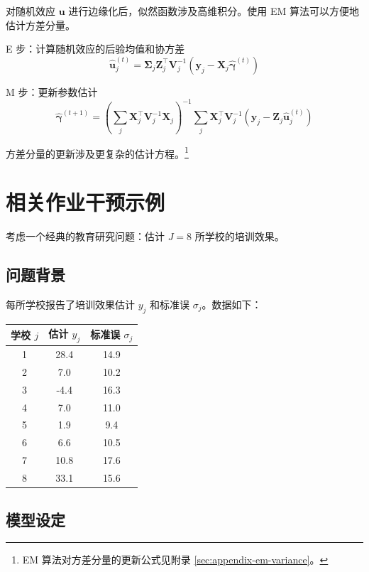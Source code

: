 对随机效应 $\mathbf{u}$ 进行边缘化后，似然函数涉及高维积分。使用 EM 算法可以方便地估计方差分量。

E 步：计算随机效应的后验均值和协方差
\[
\widehat{\mathbf{u}}_j^{(t)} = \boldsymbol{\Sigma}_j \mathbf{Z}_j^\top \mathbf{V}_j^{-1} (\mathbf{y}_j - \mathbf{X}_j \widehat{\boldsymbol{\gamma}}^{(t)})
\]

M 步：更新参数估计
\[
\widehat{\boldsymbol{\gamma}}^{(t+1)} = \left(\sum_j \mathbf{X}_j^\top \mathbf{V}_j^{-1} \mathbf{X}_j \right)^{-1} \sum_j \mathbf{X}_j^\top \mathbf{V}_j^{-1} (\mathbf{y}_j - \mathbf{Z}_j \widehat{\mathbf{u}}_j^{(t)})
\]

方差分量的更新涉及更复杂的估计方程。\footnote{EM 算法对方差分量的更新公式见附录 \cref{sec:appendix-em-variance}。}

\section{相关作业干预示例}
\label{sec:example- coaching}

考虑一个经典的教育研究问题：估计 $J = 8$ 所学校的培训效果。

\subsection{问题背景}
\label{sec:coaching-background}

每所学校报告了培训效果估计 $y_j$ 和标准误 $\sigma_j$。数据如下：

\begin{center}
\begin{tabular}{ccc}
\hline
学校 $j$ & 估计 $y_j$ & 标准误 $\sigma_j$ \\
\hline
1 & 28.4 & 14.9 \\
2 & 7.0 & 10.2 \\
3 & -4.4 & 16.3 \\
4 & 7.0 & 11.0 \\
5 & 1.9 & 9.4 \\
6 & 6.6 & 10.5 \\
7 & 10.8 & 17.6 \\
8 & 33.1 & 15.6 \\
\hline
\end{tabular}
\end{center}

\subsection{模型设定}
\label{sec:coaching-model}

